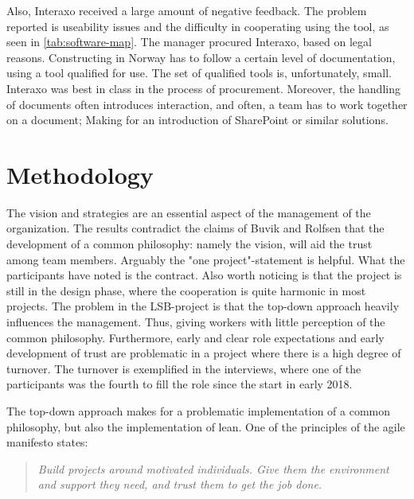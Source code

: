 Also, Interaxo received a large amount of negative feedback. The problem reported is useability issues and the difficulty in cooperating using the tool, as seen in \ref{tab:software-map}. The manager procured Interaxo, based on legal reasons. Constructing in Norway has to follow a certain level of documentation, using a tool qualified for use. The set of qualified tools is, unfortunately, small. Interaxo was best in class in the process of procurement. Moreover, the handling of documents often introduces interaction, and often, a team has to work together on a document; Making for an introduction of SharePoint or similar solutions. 

\section{Methodology}
The vision and strategies are an essential aspect of the management of the organization. The results contradict the claims of Buvik and Rolfsen \cite{rolfsen} that the development of a common philosophy: namely the vision, will aid the trust among team members. Arguably the "one project"-statement is helpful. What the participants have noted is the contract. Also worth noticing is that the project is still in the design phase, where the cooperation is quite harmonic in most projects. The problem in the LSB-project is that the top-down approach heavily influences the management. Thus, giving workers with little perception of the common philosophy. Furthermore, early and clear role expectations and early development of trust are problematic in a project where there is a high degree of turnover. The turnover is exemplified in the interviews, where one of the participants was the fourth to fill the role since the start in early 2018.
     
The top-down approach makes for a problematic implementation of a common philosophy, but also the implementation of lean. One of the principles of the agile manifesto \cite{agile_manifesto} states:
\begin{quote}
    \textit{Build projects around motivated individuals. Give them the environment and support they need, and trust them to get the job done.}
\end{quote}
    

